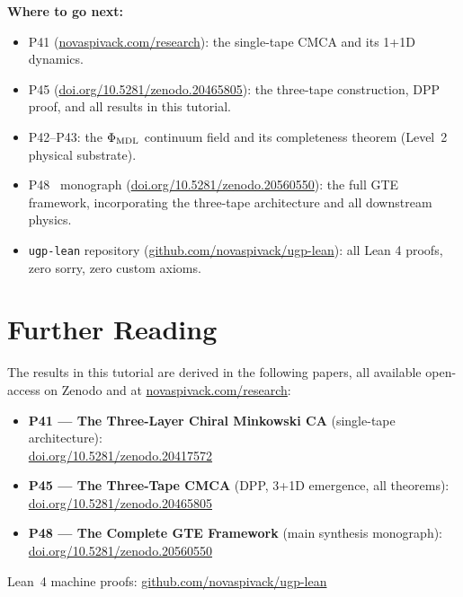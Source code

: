 \documentclass[11pt,a4paper]{article}
\begin{document}
\bigskip
\noindent\textbf{Where to go next:}
\begin{itemize}
  \item P41 (\href{https://novaspivack.com/research}{novaspivack.com/research}):
        the single-tape CMCA and its 1+1D dynamics.
  \item P45 (\href{https://doi.org/10.5281/zenodo.20465805}{doi.org/10.5281/zenodo.20465805}):
        the three-tape construction, DPP proof, and all results in this tutorial.
  \item P42--P43: the $\Phi_{\rm MDL}$ continuum field and its completeness theorem
        (Level~2 physical substrate).
  \item P48~\cite{SpivackGTECompleteFramework} monograph
        (\href{https://doi.org/10.5281/zenodo.20560550}{doi.org/10.5281/zenodo.20560550}):
        the full GTE framework, incorporating the three-tape architecture and all
        downstream physics.
  \item \texttt{ugp-lean} repository
        (\href{https://github.com/novaspivack/ugp-lean}{github.com/novaspivack/ugp-lean}):
        all Lean 4 proofs, zero sorry, zero custom axioms.
\end{itemize}


\section*{Further Reading}
\begin{tcolorbox}[colback=orange!8,colframe=orange!50!black,
  title=\textbf{Primary Sources}]
The results in this tutorial are derived in the following papers,
all available open-access on Zenodo and at
\href{https://novaspivack.com/research}{novaspivack.com/research}:
\begin{itemize}
  \item \textbf{P41 --- The Three-Layer Chiral Minkowski CA} (single-tape architecture):\\
        \href{https://doi.org/10.5281/zenodo.20417572}{doi.org/10.5281/zenodo.20417572}
  \item \textbf{P45 --- The Three-Tape CMCA} (DPP, 3+1D emergence, all theorems):\\
        \href{https://doi.org/10.5281/zenodo.20465805}{doi.org/10.5281/zenodo.20465805}
  \item \textbf{P48 --- The Complete GTE Framework} (main synthesis monograph):\\
        \href{https://doi.org/10.5281/zenodo.20560550}{doi.org/10.5281/zenodo.20560550}
\end{itemize}
Lean~4 machine proofs: \href{https://github.com/novaspivack/ugp-lean}{github.com/novaspivack/ugp-lean}
\end{tcolorbox}


\end{document}
